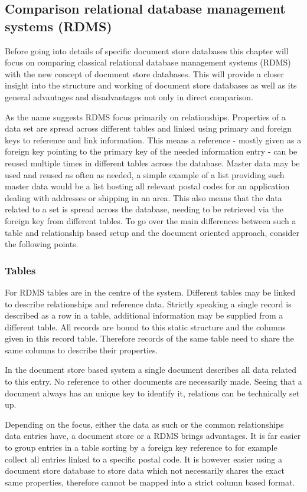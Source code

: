 \subsection{Comparison relational database management systems (RDMS)}
\label{docoriented:section:postalcodes}
Before going into details of specific document store databases this chapter will focus on comparing classical relational database management systems (RDMS) with the new concept of document store databases. This will provide a closer insight into the structure and working of document store databases as well as its general advantages and disadvantages not only in direct comparison.

As the name suggests RDMS focus primarily on relationships. Properties of a data set are spread across different tables and linked using primary and foreign keys to reference and link information. This means a reference - mostly given as a foreign key pointing to the primary key of the needed information entry - can be reused multiple times in different tables across the database. Master data may be used and reused as often as needed, a simple example of a list providing such master data would be a list hosting all relevant postal codes for an application dealing with addresses or shipping in an area. This also means that the data related to a set is spread across the database, needing to be retrieved via the foreign key from different tables. To go over the main differences between such a table and relationship based setup and the document oriented approach, consider the following points.
\subsubsection{Tables}
For RDMS tables are in the centre of the system. Different tables may be linked to describe relationships and reference data. Strictly speaking a single record is described as a row in a table, additional information may be supplied from a different table. All records are bound to this static structure and the columns given in this record table. Therefore records of the same table need to share the same columns to describe their properties.

In the document store based system a single document describes all data related to this entry. No reference to other documents are necessarily made. Seeing that a document always has an unique key to identify it, relations can be technically set up.

Depending on the focus, either the data as such or the common relationships data entries have, a document store or a RDMS brings advantages. It is far easier to group entries in a table sorting by a foreign key reference to for example collect all entries linked to a specific postal code. It is however easier using a document store database to store data which not necessarily shares the exact same properties, therefore cannot be mapped into a strict column based format.
